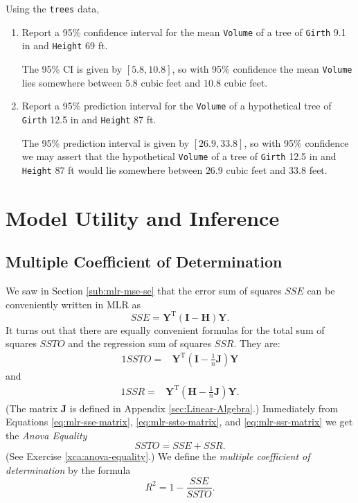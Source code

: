 \documentclass[captions=tableheading]{scrbook}
\begin{document}
\begin{example}
Using the \texttt{trees} data, 

\begin{enumerate}
\item Report a 95\% confidence interval for the mean \texttt{Volume} of a tree of \texttt{Girth} 9.1 in and \texttt{Height} 69 ft.

   The 95\% CI is given by \( [  5.8,  10.8 ] \), so with 95\% confidence the mean \texttt{Volume} lies somewhere between \(  5.8 \) cubic feet and \(  10.8 \) cubic feet.
\item Report a 95\% prediction interval for the \texttt{Volume} of a hypothetical tree of \texttt{Girth} 12.5 in and \texttt{Height} 87 ft.

   The 95\% prediction interval is given by \( [  26.9,  33.8 ] \), so with 95\% confidence we may assert that the hypothetical \texttt{Volume} of a tree of \texttt{Girth} 12.5 in and \texttt{Height} 87 ft would lie somewhere between \(  26.9 \) cubic feet and \(  33.8 \) feet.
\end{enumerate}

\end{example}
\section{Model Utility and Inference}
\label{sec-12-3}

\label{sec:Model-Utility-and-MLR}
\subsection{Multiple Coefficient of Determination}
\label{sec-12-3-1}


We saw in Section \ref{sub:mlr-mse-se} that the error sum of squares \(SSE\) can be conveniently written in MLR as 
\begin{equation}
SSE=\mathbf{Y}^{\mathrm{T}}(\mathbf{I}-\mathbf{H})\mathbf{Y}.\label{eq:mlr-sse-matrix}
\end{equation}
It turns out that there are equally convenient formulas for the total sum of squares \(SSTO\) and the regression sum of squares \(SSR\). They are:
\begin{alignat}{1}
SSTO= & \mathbf{Y}^{\mathrm{T}}\left(\mathbf{I}-\frac{1}{n}\mathbf{J}\right)\mathbf{Y}\label{eq:mlr-ssto-matrix}
\end{alignat}
and
\begin{alignat}{1}
SSR= & \mathbf{Y}^{\mathrm{T}}\left(\mathbf{H}-\frac{1}{n}\mathbf{J}\right)\mathbf{Y}.\label{eq:mlr-ssr-matrix}
\end{alignat}
(The matrix \(\mathbf{J}\) is defined in Appendix \ref{sec:Linear-Algebra}.) Immediately from Equations \ref{eq:mlr-sse-matrix}, \ref{eq:mlr-ssto-matrix}, and \ref{eq:mlr-ssr-matrix} we get the \emph{Anova Equality}
\begin{equation} 
SSTO=SSE+SSR.
\end{equation}
(See Exercise \ref{xca:anova-equality}.) We define the \emph{multiple coefficient of determination} by the formula
\begin{equation} 
R^{2}=1-\frac{SSE}{SSTO}.
\end{equation}
\end{document}
